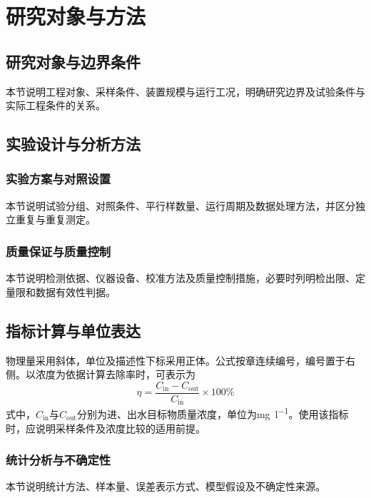 \chapter{研究对象与方法}
\section{研究对象与边界条件}
本节说明工程对象、采样条件、装置规模与运行工况，明确研究边界及试验条件与实际工程条件的关系。
\section{实验设计与分析方法}
\subsection{实验方案与对照设置}
本节说明试验分组、对照条件、平行样数量、运行周期及数据处理方法，并区分独立重复与重复测定。
\subsection{质量保证与质量控制}
本节说明检测依据、仪器设备、校准方法及质量控制措施，必要时列明检出限、定量限和数据有效性判据。
\section{指标计算与单位表达}
物理量采用斜体，单位及描述性下标采用正体。公式按章连续编号，编号置于右侧。以浓度为依据计算去除率时，可表示为
\begin{equation}
  \eta=\frac{C_{\mathrm{in}}-C_{\mathrm{out}}}{C_{\mathrm{in}}}\times100\%
  \label{eq:removal}
\end{equation}
式中，$C_{\mathrm{in}}$与$C_{\mathrm{out}}$分别为进、出水目标物质量浓度，单位为\unit{\milli\gram\per\litre}。使用该指标时，应说明采样条件及浓度比较的适用前提。
\subsection{统计分析与不确定性}
本节说明统计方法、样本量、误差表示方式、模型假设及不确定性来源。
